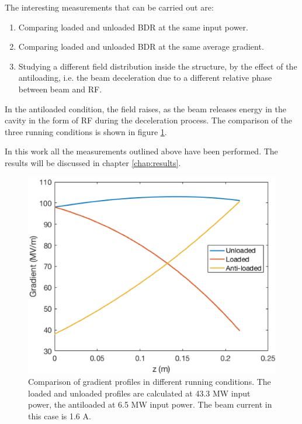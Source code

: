 The interesting measurements that can be carried out are:
\begin{enumerate}
\item Comparing  loaded and unloaded BDR at the same input power.
\item Comparing  loaded and unloaded BDR at the same average gradient.
\item Studying a different field distribution inside the structure, by the effect of the antiloading, i.e. the beam deceleration due to a different relative phase between beam and RF.
\end{enumerate}
In the antiloaded condition, the field raises, as the beam releases energy in the cavity in the form of RF during the deceleration process. The comparison of the three running conditions is shown in figure \ref{3grad}.

In this work all the measurements outlined above have been performed. The results will be discussed in chapter \ref{chap:results}.

\begin{figure}[h]
\centering 
\includegraphics[scale=1]{pictures/3gradient.png}
\caption{Comparison of gradient profiles in different running conditions. The loaded and unloaded profiles are calculated at 43.3 MW input power, the antiloaded at 6.5 MW input power. The beam current in this case is 1.6 A.}
\label{3grad}
\end{figure}